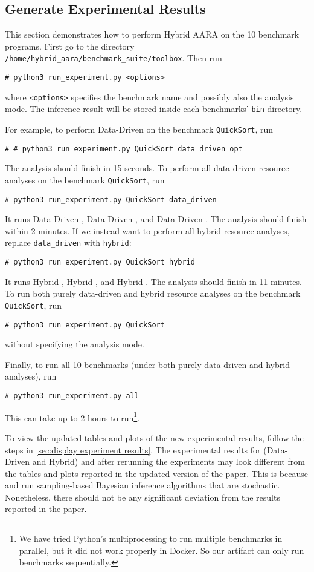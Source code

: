 \subsection{Generate Experimental Results}
\label{sec:generate experiment results}

This section demonstrates how to perform Hybrid AARA on the 10 benchmark
programs.
%
First go to the directory \texttt{/home/hybrid\_aara/benchmark\_suite/toolbox}.
%
Then run
\begin{verbatim}
# python3 run_experiment.py <options>
\end{verbatim}
where \texttt{<options>} specifies the benchmark name and possibly also the
analysis mode.
%
The inference result will be stored inside each benchmarks' \texttt{bin}
directory.

For example, to perform Data-Driven \Opt{} on the benchmark \texttt{QuickSort},
run
\begin{verbatim}
# # python3 run_experiment.py QuickSort data_driven opt
\end{verbatim}
%
The analysis should finish in 15 seconds.
%
To perform all data-driven resource analyses on the benchmark
\texttt{QuickSort}, run
\begin{verbatim}
# python3 run_experiment.py QuickSort data_driven
\end{verbatim}
%
It runs Data-Driven \Opt{}, Data-Driven \BayesWC{}, and Data-Driven \BayesPC{}.
%
The analysis should finish within 2 minutes.
%
If we instead want to perform all hybrid resource analyses, replace
\texttt{data\_driven} with \texttt{hybrid}:
\begin{verbatim}
# python3 run_experiment.py QuickSort hybrid
\end{verbatim}
%
It runs Hybrid \Opt{}, Hybrid \BayesWC{}, and Hybrid \BayesPC{}.
%
The analysis should finish in 11 minutes.
%
To run both purely data-driven and hybrid resource analyses on the benchmark
\texttt{QuickSort}, run
\begin{verbatim}
# python3 run_experiment.py QuickSort
\end{verbatim}
without specifying the analysis mode.

Finally, to run all 10 benchmarks (under both purely data-driven and hybrid
analyses), run
\begin{verbatim}
# python3 run_experiment.py all
\end{verbatim}
This can take up to 2 hours to run\footnote{We have tried Python's
  multiprocessing to run multiple benchmarks in parallel, but it did not work
  properly in Docker. So our artifact can only run benchmarks sequentially.}.

To view the updated tables and plots of the new experimental results, follow the
steps in \cref{sec:display experiment results}.
%
The experimental results for (Data-Driven and Hybrid) \BayesWC{} and \BayesPC{}
after rerunning the experiments may look different from the tables and plots
reported in the updated version of the paper.
%
This is because \BayesWC{} and \BayesPC{} run sampling-based Bayesian inference
algorithms that are stochastic.
%
Nonetheless, there should not be any significant deviation from the results
reported in the paper.

